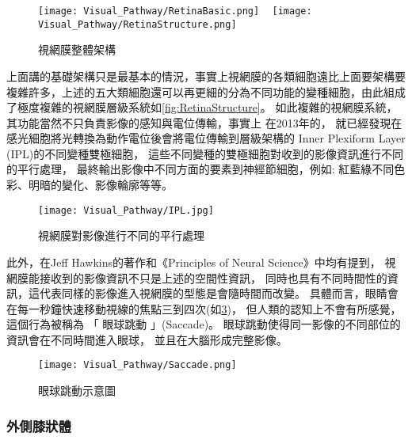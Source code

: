 \documentclass[class=NCU_thesis, crop=false]{standalone}
\begin{document}
\begin{figure}[H]
  \centering
    {\texttt{[image: Visual\_Pathway/RetinaBasic.png]}
    }
~
    {\texttt{[image: Visual\_Pathway/RetinaStructure.png]}
    }
  \caption{視網膜整體架構}
  \label{fig:RetinaTotalStructure}
\end{figure}

上面講的基礎架構只是最基本的情況，事實上視網膜的各類細胞遠比上面要架構要複雜許多，上述的五大類細胞還可以再更細的分為不同功能的變種細胞，由此組成了極度複雜的視網膜層級系統如\cref{fig:RetinaStructure}。
如此複雜的視網膜系統，其功能當然不只負責影像的感知與電位傳輸，事實上
在2013年的\cite{annurev}，
就已經發現在感光細胞將光轉換為動作電位後會將電位傳輸到層級架構的 Inner Plexiform Layer (IPL)的不同變種雙極細胞，
這些不同變種的雙極細胞對收到的影像資訊進行不同的平行處理，
最終輸出影像中不同方面的要素到神經節細胞，例如: 紅藍綠不同色彩、明暗的變化、影像輪廓等等。

\begin{figure}[H]
  \centering
  \texttt{[image: Visual\_Pathway/IPL.jpg]}
  \caption{視網膜對影像進行不同的平行處理~\cite{annurev}}
  \label{fig:IPL}
\end{figure}
\pagebreak

此外，在Jeff Hawkins的著作\cite{10.5555993636}和《Principles of Neural Science》\cite{1180370208}中均有提到，
視網膜能接收到的影像資訊不只是上述的空間性資訊，
同時也具有不同時間性的資訊，這代表同樣的影像進入視網膜的型態是會隨時間而改變。
具體而言，眼睛會在每一秒鐘快速移動視線的焦點三到四次(如\cref{fig:Saccade})，
但人類的認知上不會有所感覺，這個行為被稱為 「 眼球跳動 」(Saccade)。
眼球跳動使得同一影像的不同部位的資訊會在不同時間進入眼球，
並且在大腦形成完整影像。

\begin{figure}[H]
  \centering
  \texttt{[image: Visual\_Pathway/Saccade.png]}
  \caption{眼球跳動示意圖~\cite{annurev}}
  \label{fig:Saccade}
\end{figure}

\subsubsection{外側膝狀體}
\end{document}
